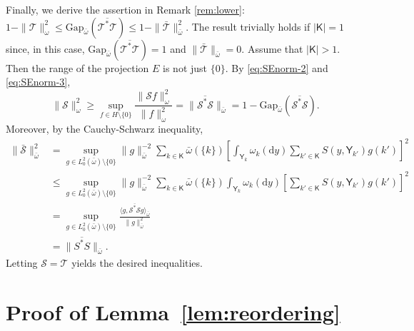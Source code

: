 \documentclass[12pt]{article}
\newcommand{\df}{\mathrm{d}}
\newcommand{\Y}{\mathsf{Y}}
\newcommand{\Mtk}{\mtkfont{T}}
\newcommand{\mtkfont}{\mathcal}
\begin{document}
{
Finally, we derive the assertion in Remark \ref{rem:lower}:
$
1 - \|\Mtk\|_{\omega}^2 \leq \mbox{Gap}_{\bar{\omega}}(\overline{\Mtk^* \Mtk}) \leq 1 - \|\bar{\mtkfont{T}}\|_{\bar{\omega}}^2.
$
The result trivially holds if $|\mathsf{K}| = 1$ since, in this case, $ \mbox{Gap}_{\bar{\omega}}(\overline{\Mtk^* \Mtk}) =  1$ and $\|\bar{\Mtk}\|_{\bar{\omega}} = 0$.
Assume that $|\mathsf{K}| > 1$.
Then the range of the projection $E$ is not just $\{0\}$.
By \eqref{eq:SEnorm-2} and \eqref{eq:SEnorm-3},
\[
\|\mtkfont{S}\|_{\omega}^2 \geq \sup_{f \in H \setminus \{0\}} \frac{\|\mtkfont{S} f\|_{\omega}^2}{\|f\|_{\omega}^2} = \|\overline{\mtkfont{S}^* \mtkfont{S}}\|_{\bar{\omega}} = 1 - \mbox{Gap}_{\bar{\omega}} ( \overline{\mtkfont{S}^* \mtkfont{S}} ).
\]
Moreover, by the Cauchy-Schwarz inequality,
\[
\begin{aligned}
	\|\bar{\mtkfont{S}}\|_{\bar{\omega}}^2 &= \sup_{g \in L_0^2(\bar{\omega})  \setminus \{0\}} \|g\|_{\bar{\omega}}^{-2} \sum_{k \in \mathsf{K}} \bar{\omega}(\{k\}) \left[  \int_{\Y_k} \omega_k(\df y) \sum_{k' \in \mathsf{K}} S(y, \Y_{k'}) g(k') \right]^2 \\
	&\leq \sup_{g \in L_0^2(\bar{\omega}) \setminus \{0\}} \|g\|_{\bar{\omega}}^{-2} \sum_{k \in \mathsf{K}} \bar{\omega}(\{k\})   \int_{\Y_k} \omega_k(\df y) \left[ \sum_{k' \in \mathsf{K}} S(y, \Y_{k'}) g(k') \right]^2 \\
	&= \sup_{g \in L_0^2(\bar{\omega}) \setminus \{0\}} \frac{ \langle g, \overline{\mtkfont{S}^*\mtkfont{S}} g \rangle_{\bar{\omega}} }{\|g\|_{\bar{\omega}}^2} \\
	&= \|\overline{S^*S}\|_{\bar{\omega}}.
\end{aligned}
\]
Letting $\mtkfont{S} = \Mtk$ yields the desired inequalities.
}







{
\section{Proof of Lemma~\ref{lem:reordering}} \label{app:reordering-invariant}
}
\end{document}
